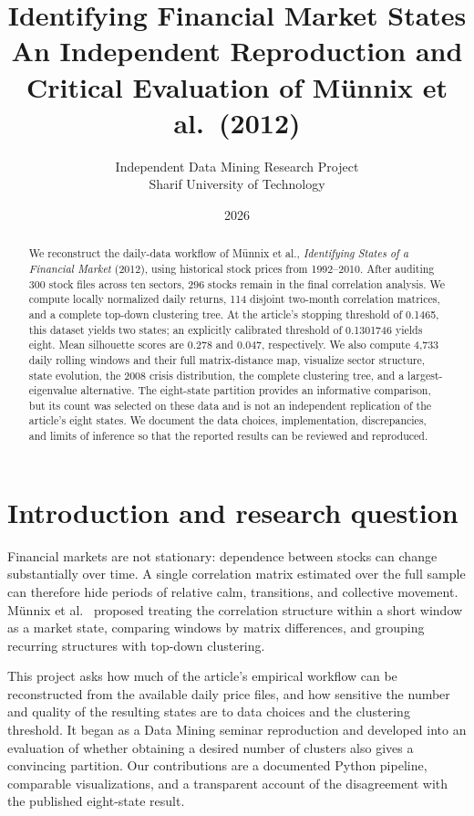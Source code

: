 \documentclass[11pt,a4paper]{article}
\title{Identifying Financial Market States\\[0.25em]\large An Independent Reproduction and Critical Evaluation of M\"unnix et al.\ (2012)}
\author{Independent Data Mining Research Project\\Sharif University of Technology}
\date{2026}
\begin{document}
\maketitle
\begin{abstract}
We reconstruct the daily-data workflow of M\"unnix et al., \emph{Identifying States of a Financial Market} (2012), using historical stock prices from 1992--2010. After auditing 300 stock files across ten sectors, 296 stocks remain in the final correlation analysis. We compute locally normalized daily returns, 114 disjoint two-month correlation matrices, and a complete top-down clustering tree. At the article's stopping threshold of 0.1465, this dataset yields two states; an explicitly calibrated threshold of 0.1301746 yields eight. Mean silhouette scores are 0.278 and 0.047, respectively. We also compute 4,733 daily rolling windows and their full matrix-distance map, visualize sector structure, state evolution, the 2008 crisis distribution, the complete clustering tree, and a largest-eigenvalue alternative. The eight-state partition provides an informative comparison, but its count was selected on these data and is not an independent replication of the article's eight states. We document the data choices, implementation, discrepancies, and limits of inference so that the reported results can be reviewed and reproduced.
\end{abstract}
\setcounter{tocdepth}{1}
\tableofcontents
\newpage

\section{Introduction and research question}
Financial markets are not stationary: dependence between stocks can change substantially over time. A single correlation matrix estimated over the full sample can therefore hide periods of relative calm, transitions, and collective movement. M\"unnix et al.\ \cite{munnix2012} proposed treating the correlation structure within a short window as a market state, comparing windows by matrix differences, and grouping recurring structures with top-down clustering.

This project asks how much of the article's empirical workflow can be reconstructed from the available daily price files, and how sensitive the number and quality of the resulting states are to data choices and the clustering threshold. It began as a Data Mining seminar reproduction and developed into an evaluation of whether obtaining a desired number of clusters also gives a convincing partition. Our contributions are a documented Python pipeline, comparable visualizations, and a transparent account of the disagreement with the published eight-state result.
\end{document}
